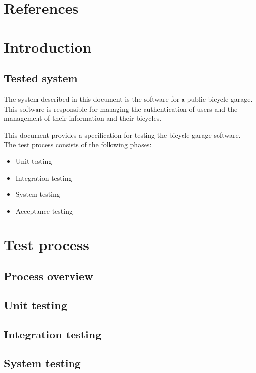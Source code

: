\documentclass[12pt,titlepage,bibliography=totoc]{article}
\begin{document}


\maketitle
\newpage
\tableofcontents
\thispagestyle{empty}
\setcounter{page}{0}
\newpage

\section{References}
\label{sec:references}

\section{Introduction}
\label{sec:introduction}
\subsection{Tested system}

The system described in this document is the software for a public bicycle
garage. This software is responsible for managing the authentication of users
and the management of their information and their bicycles.

This document provides a specification for testing the bicycle garage software.
The test process consists of the following phases:
\begin{itemize}
	\item Unit testing
	\item Integration testing
	\item System testing
	\item Acceptance testing
\end{itemize}

\section{Test process}
\label{sec:test-process}
\subsection{Process overview}
\subsection{Unit testing}
\subsection{Integration testing}
\subsection{System testing}
\end{document}
